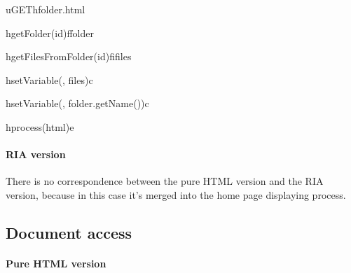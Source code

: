 \documentclass[a4paper, dvipsnames]{article}
\begin{document}
	\begin{center}
		\begin{sequencediagram}
			
			\begin{call}{u}{GET}{h}{folder.html}
				\begin{call}{h}{getFolder(id)}{f}{folder}
				\end{call}
				\begin{call}{h}{getFilesFromFolder(id)}{fi}{files}
				\end{call}
				\begin{call}{h}{setVariable(, files)}{c}{}
				\end{call}
				\begin{call}{h}{setVariable(, folder.getName())}{c}{}
				\end{call}
				\begin{call}{h}{process(html)}{e}{}
				\end{call}
			\end{call}
		\end{sequencediagram}
	\end{center}
	
	\paragraph{RIA version} There is no correspondence between the pure HTML version and the RIA version, because in this case it's merged into the home page displaying process.
	
	\pagebreak
	
	\subsection{Document access}
	
	\paragraph{Pure HTML version}
	
\end{document}

